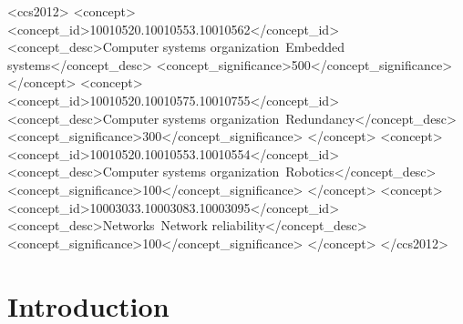 \documentclass[sigconf, review, nonacm]{acmart}
\begin{document}
\begin{CCSXML}
<ccs2012>
 <concept>
  <concept_id>10010520.10010553.10010562</concept_id>
  <concept_desc>Computer systems organization~Embedded systems</concept_desc>
  <concept_significance>500</concept_significance>
 </concept>
 <concept>
  <concept_id>10010520.10010575.10010755</concept_id>
  <concept_desc>Computer systems organization~Redundancy</concept_desc>
  <concept_significance>300</concept_significance>
 </concept>
 <concept>
  <concept_id>10010520.10010553.10010554</concept_id>
  <concept_desc>Computer systems organization~Robotics</concept_desc>
  <concept_significance>100</concept_significance>
 </concept>
 <concept>
  <concept_id>10003033.10003083.10003095</concept_id>
  <concept_desc>Networks~Network reliability</concept_desc>
  <concept_significance>100</concept_significance>
 </concept>
</ccs2012>
\end{CCSXML}




\maketitle

\section{Introduction}
\end{document}
